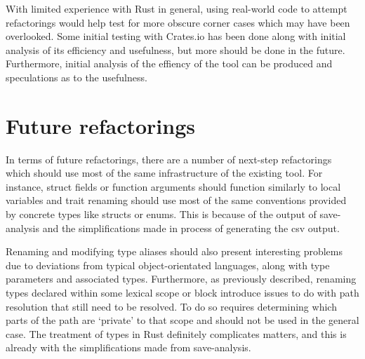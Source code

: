 
With limited experience with Rust in general, using real-world code to attempt refactorings would help test for more obscure corner cases which may have been overlooked. Some initial testing with Crates.io \cite{cratesio15} has been done along with initial analysis of its efficiency and usefulness, but more should be done in the future. Furthermore, initial analysis of the effiency of the tool can be produced and speculations as to the usefulness. 


\section{Future refactorings}
In terms of future refactorings, there are a number of next-step refactorings which should use most of the same infrastructure of the existing tool. For instance, struct fields or function arguments should function similarly to local variables and trait renaming should use most of the same conventions provided by concrete types like structs or enums. This is because of the output of save-analysis and the simplifications made in process of generating the csv output.


Renaming and modifying type aliases should also present interesting problems due to deviations from typical object-orientated languages, along with type parameters and associated types. Furthermore, as previously described, renaming types declared within some lexical scope or block introduce issues to do with path resolution that still need to be resolved. To do so requires determining which parts of the path are `private' to that scope and should not be used in the general case. The treatment of types in Rust definitely complicates matters, and this is already with the simplifications made from save-analysis.

